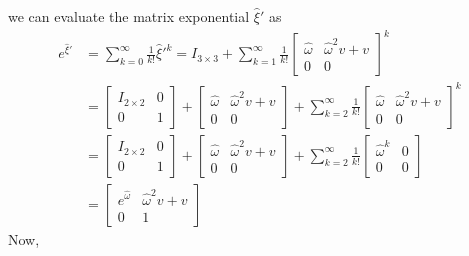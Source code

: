we can evaluate the matrix exponential \( \hat \xi' \) as
\begin{align*}
    e^{\hat \xi'}
     & =
    \sum_{k=0}^{\infty} \frac{1}{k!} \hat \xi'^k
    =
    I_{3\times 3} + \sum_{k=1}^{\infty} \frac{1}{k!}
    \begin{bmatrix}
        \hat \omega & \hat \omega^2 v + v \\
        0           & 0
    \end{bmatrix}
    ^k
    \\ & =
    \begin{bmatrix}
        I_{2\times 2} & 0 \\
        0             & 1
    \end{bmatrix}
    +
    \begin{bmatrix}
        \hat \omega & \hat \omega^2 v + v \\
        0           & 0
    \end{bmatrix}
    +
    \sum_{k=2}^{\infty} \frac{1}{k!}
    \begin{bmatrix}
        \hat \omega & \hat \omega^2 v + v \\
        0           & 0
    \end{bmatrix}
    ^k
    \\ & =
    \begin{bmatrix}
        I_{2\times 2} & 0 \\
        0             & 1
    \end{bmatrix}
    +
    \begin{bmatrix}
        \hat \omega & \hat \omega^2 v + v \\
        0           & 0
    \end{bmatrix}
    +
    \sum_{k=2}^{\infty} \frac{1}{k!}
    \begin{bmatrix}
        \hat \omega ^k & 0 \\
        0              & 0
    \end{bmatrix}
    \\ & =
    \begin{bmatrix}
        e^{\hat \omega} & \hat \omega^2 v + v \\
        0               & 1
    \end{bmatrix}
\end{align*}
Now,

